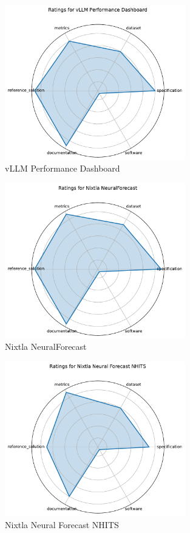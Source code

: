 \documentclass{article}
\begin{document}
\begin{figure}[h!]
  \centering
  \includegraphics[width=0.7\textwidth]{vLLM Performance Dashboard_radar.pdf}
  \caption{vLLM Performance Dashboard}
\end{figure}

\begin{figure}[h!]
  \centering
  \includegraphics[width=0.7\textwidth]{Nixtla NeuralForecast_radar.pdf}
  \caption{Nixtla NeuralForecast}
\end{figure}

\begin{figure}[h!]
  \centering
  \includegraphics[width=0.7\textwidth]{Nixtla Neural Forecast NHITS_radar.pdf}
  \caption{Nixtla Neural Forecast NHITS}
\end{figure}
\end{document}
